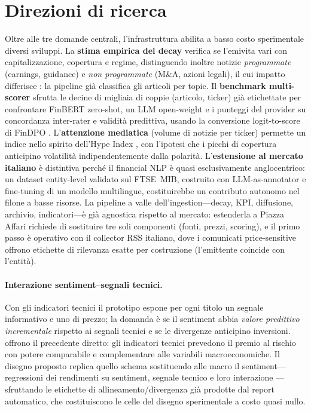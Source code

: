 \documentclass[a4paper,11pt]{article}
\begin{document}
\section{Direzioni di ricerca}

Oltre alle tre domande centrali, l'infrastruttura abilita a basso costo sperimentale diversi sviluppi. La \textbf{stima empirica del decay} verifica se l'emivita vari con capitalizzazione, copertura e regime, distinguendo inoltre notizie \emph{programmate} (earnings, guidance) e \emph{non programmate} (M\&A, azioni legali), il cui impatto differisce \parencite{boudoukh2019information}: la pipeline già classifica gli articoli per topic. Il \textbf{benchmark multi-scorer} sfrutta le decine di migliaia di coppie (articolo, ticker) già etichettate per confrontare FinBERT zero-shot, un LLM open-weight e i punteggi del provider su concordanza inter-rater e validità predittiva, usando la conversione logit-to-score di FinDPO \parencite{iacovides2025findpo}. L'\textbf{attenzione mediatica} (volume di notizie per ticker) permette un indice nello spirito dell'Hype Index \parencite{cao2025hypeindexnlpdrivenmeasure}, con l'ipotesi che i picchi di copertura anticipino volatilità indipendentemente dalla polarità. L'\textbf{estensione al mercato italiano} è distintiva perché il financial NLP è quasi esclusivamente anglocentrico: un dataset entity-level validato sul FTSE~MIB, costruito con LLM-as-annotator e fine-tuning di un modello multilingue, costituirebbe un contributo autonomo nel filone a basse risorse. La pipeline a valle dell'ingestion---decay, KPI, diffusione, archivio, indicatori---è già agnostica rispetto al mercato: estenderla a Piazza Affari richiede di sostituire tre soli componenti (fonti, prezzi, scoring), e il primo passo è operativo con il collector RSS italiano, dove i comunicati price-sensitive offrono etichette di rilevanza esatte per costruzione (l'emittente coincide con l'entità).

\paragraph{Interazione sentiment--segnali tecnici.} Con gli indicatori tecnici il prototipo espone per ogni titolo un segnale informativo e uno di prezzo; la domanda è se il sentiment abbia \emph{valore predittivo incrementale} rispetto ai segnali tecnici e se le divergenze anticipino inversioni. \textcite{neely2014forecasting} offrono il precedente diretto: gli indicatori tecnici prevedono il premio al rischio con potere comparabile e complementare alle variabili macroeconomiche. Il disegno proposto replica quello schema sostituendo alle macro il sentiment---regressioni dei rendimenti su sentiment, segnale tecnico e loro interazione \parencite{brock1992simple}---sfruttando le etichette di allineamento/divergenza già prodotte dal report automatico, che costituiscono le celle del disegno sperimentale a costo quasi nullo.
\end{document}
